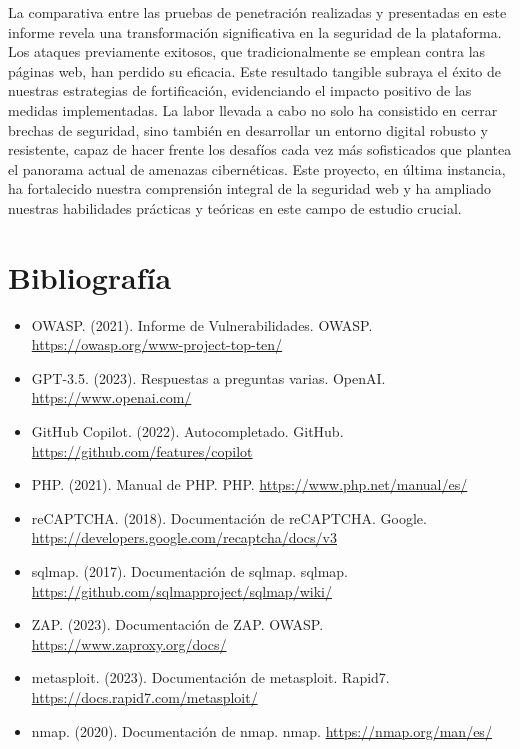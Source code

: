 \documentclass{report}
\begin{document}
        La comparativa entre las pruebas de penetración realizadas y presentadas en este informe revela una transformación significativa en la seguridad de la plataforma. Los ataques previamente exitosos, que tradicionalmente se emplean contra las páginas web, han perdido su eficacia. Este resultado tangible subraya el éxito de nuestras estrategias de fortificación, evidenciando el impacto positivo de las medidas implementadas. La labor llevada a cabo no solo ha consistido en cerrar brechas de seguridad, sino también en desarrollar un entorno digital robusto y resistente, capaz de hacer frente los desafíos cada vez más sofisticados que plantea el panorama actual de amenazas cibernéticas. Este proyecto, en última instancia, ha fortalecido nuestra comprensión integral de la seguridad web y ha ampliado nuestras habilidades prácticas y teóricas en este campo de estudio crucial.\\
    \chapter{Bibliografía}
        \begin{itemize}
            \item OWASP. (2021). Informe de Vulnerabilidades. OWASP. \url{https://owasp.org/www-project-top-ten/}
            \item GPT-3.5. (2023). Respuestas a preguntas varias. OpenAI. \url{https://www.openai.com/}
            \item GitHub Copilot. (2022). Autocompletado. GitHub. \url{https://github.com/features/copilot}
            \item PHP. (2021). Manual de PHP. PHP. \url{https://www.php.net/manual/es/}
            \item reCAPTCHA. (2018). Documentación de reCAPTCHA. Google. \url{https://developers.google.com/recaptcha/docs/v3}
            \item sqlmap. (2017). Documentación de sqlmap. sqlmap. \url{https://github.com/sqlmapproject/sqlmap/wiki/}
            \item ZAP. (2023). Documentación de ZAP. OWASP. \url{https://www.zaproxy.org/docs/}
            \item metasploit. (2023). Documentación de metasploit. Rapid7. \url{https://docs.rapid7.com/metasploit/}
            \item nmap. (2020). Documentación de nmap. nmap. \url{https://nmap.org/man/es/}
        \end{itemize}
\end{document}
